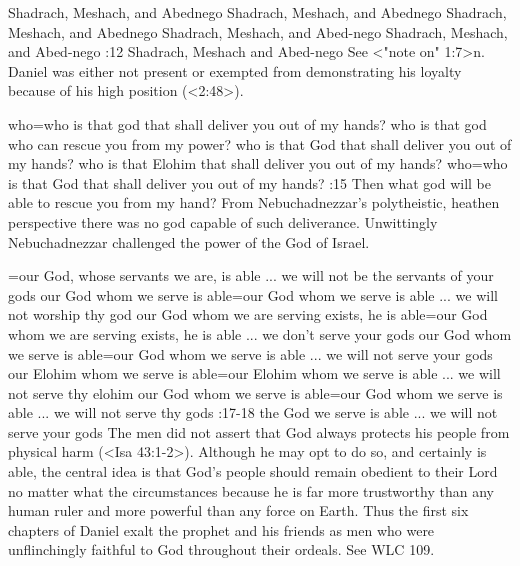     {Shadrach, Meshach, and Abednego} %
    {Shadrach, Meshach, and Abednego} %
    {Shadrach, Meshach, and Abednego} %
    {Shadrach, Meshach, and Abed-nego} %
    {Shadrach, Meshach, and Abed-nego} %
:12 {Shadrach, Meshach and Abed-nego} See <"note on" 1:7>n. Daniel was either not present or exempted from
demonstrating his loyalty because of his high position (<2:48>).


    {who}={who is that god that shall deliver you out of my hands?} %
    {who is that god who can rescue you from my power?} %
    {who is that God that shall deliver you out of my hands?} %
    {who is that Elohim that shall deliver you out of my hands?} %
    {who}={who is that God that shall deliver you out of my hands?} %
:15 {Then what god will be able to rescue you from my 
hand?} From Nebuchadnezzar's polytheistic, heathen perspective 
there was no god capable of such deliverance. Unwittingly Nebuchadnezzar challenged the power of the
God of Israel. 

={our God, whose servants we are, is able ... we will not be the servants of your gods} %
    {our God whom we serve is able}={our God whom we serve is able ... we will not worship thy god} %
    {our God whom we are serving exists, he is able}={our God whom we are serving exists, he is able ... we don’t serve your gods} %
    {our God whom we serve is able}={our God whom we serve is able ... we will not serve your gods} %
    {our Elohim whom we serve is able}={our Elohim whom we serve is able ... we will not serve thy elohim} %
    {our God whom we serve is able}={our God whom we serve is able ... we will not serve thy gods} %
:17-18 {the God we serve is able ... we will not serve your gods} The men did not assert that God
always protects his people from physical harm (<Isa 43:1-2>). Although he may opt to do so, and
certainly is able, the central idea is that God's people should remain obedient to their Lord no
matter what the circumstances because he is far more trustworthy than any human ruler and more
powerful than any force on Earth. Thus the first six chapters of Daniel exalt the prophet and his
friends as men who were unflinchingly faithful to God throughout their ordeals. See WLC 109.

